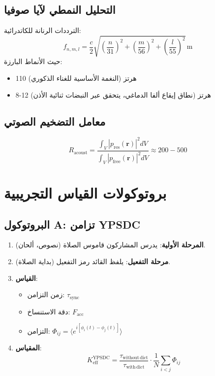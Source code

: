 \documentclass[12pt,a4paper]{article}
\begin{document}
	\subsection{التحليل النمطي لآيا صوفيا}
	
	الترددات الرنانة للكاتدرائية:
	\[
	f_{n,m,l} = \frac{c}{2} \sqrt{\left(\frac{n}{31}\right)^2 + \left(\frac{m}{56}\right)^2 + \left(\frac{l}{55}\right)^2} \, \mathrm{m}
	\]
	حيث الأنماط البارزة:
	\begin{itemize}
		\item 110 هرتز (النغمة الأساسية للغناء الذكوري)
		\item 8-12 هرتز (نطاق إيقاع ألفا الدماغي، يتحقق عبر النبضات ثنائية الأذن)
	\end{itemize}
	
	\subsection{معامل التضخيم الصوتي}
	\[
	R_{\mathrm{acoust}} = \frac{\int_V |p_{\mathrm{res}}(\mathbf{r})|^2 dV}{\int_V |p_{\mathrm{free}}(\mathbf{r})|^2 dV} \approx 200-500
	\]
	
	\section{بروتوكولات القياس التجريبية}
	
	\subsection{البروتوكول A: تزامن YPSDC}
	
	\begin{enumerate}
		\item \textbf{المرحلة الأولية}: يدرس المشاركون قاموس الصلاة (نصوص، ألحان).
		\item \textbf{مرحلة التفعيل}: يلفظ القائد رمز التفعيل (بداية الصلاة).
		\item \textbf{القياس}:
		\begin{itemize}
			\item زمن التزامن: $\tau_{\mathrm{sync}}$
			\item دقة الاستنساخ: $F_{\mathrm{acc}}$
			\item التزامن: $\Phi_{ij} = \langle e^{i[\phi_i(t) - \phi_j(t)]} \rangle$
		\end{itemize}
		\item \textbf{المقياس}:
		\[
		K_{\mathrm{eff}}^{\mathrm{YPSDC}} = \frac{\tau_{\mathrm{without\,dict}}}{\tau_{\mathrm{with\,dict}}} \cdot \frac{1}{N} \sum_{i<j} \Phi_{ij}
		\]
	\end{enumerate}
	
\end{document}
